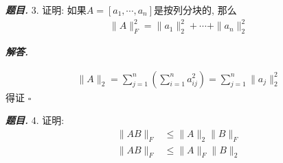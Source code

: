 \documentclass[10pt, a4paper, oneside]{ctexart}
\newcommand{\norm}[1]{\| #1 \|}
\newenvironment{problem}{\begin{framed}\par\noindent\textbf{\textit{题目. }}}{\end{framed}\par}
\newenvironment{solution}{%
  \par\noindent\textbf{\textit{解答. }}\ignorespaces
}{%
  \hfill\ensuremath{\square}\par %
}
\begin{document}
\begin{problem}
    3. 证明: 如果$A=[a_1,\cdots,a_n]$是按列分块的, 那么 
    \begin{align*}
        \norm{A}_F^2=\norm{a_1}_2^2+\cdots+\norm{a_n}_2^2
    \end{align*}
\end{problem}

\begin{solution}
\begin{align*}
    \norm{A}_2=\sum_{j=1}^n(\sum_{i=1}^n a_{ij}^2 )=\sum_{j=1}^n \norm{a_j}_2^2
\end{align*}
得证
\end{solution}

\begin{problem}
4. 证明: 
\begin{align*}
    \norm{AB}_F&\leq \norm{A}_2\norm{B}_F\\
    \norm{AB}_F&\leq \norm{A}_F\norm{B}_2
\end{align*}
\end{problem}
\end{document}
